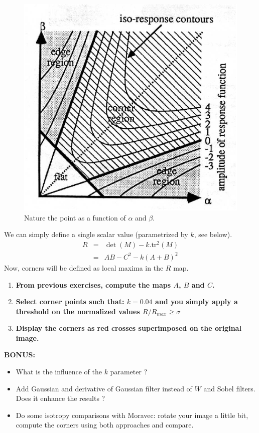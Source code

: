 \documentclass[a4paper, 11pt, french]{article}
\begin{document}
\begin{enumerate}
	\begin{figure}[htbp]
		\centerline{\includegraphics{R}}
		\caption{Nature the point as a function of $\alpha$ and $\beta$.} \label{fig.R}
	\end{figure}

	We can simply define a single scalar value (parametrized by $k$, see below).
	\begin{eqnarray}
		R & = & \det(M)-k.\mbox{tr}^2(M)\\
		  & = & AB-C^2 - k(A+B)^2
	\end{eqnarray}
	Now, corners will be defined as local maxima in the $R$ map.

	\begin{enumerate}
		\item {\bf From previous exercises, compute the maps $A$, $B$ and $C$. }
		\item {\bf Select corner points such that: $k=0.04$ and you simply apply a threshold on the normalized values $R/R_{max}\geq \sigma$ }
		\item {\bf Display the corners as red crosses superimposed on the original image.}
	\end{enumerate}

	{\bf BONUS:}
	\begin{itemize}
		\item What is the influence of the $k$ parameter ?
		\item Add Gaussian and derivative of Gaussian filter instead of $W$ and Sobel filters. Does it enhance the results ?
		\item Do some isotropy comparisons with Moravec: rotate your image a little bit, compute the corners using both approaches and compare.
	\end{itemize}
\end{enumerate}
\end{document}
